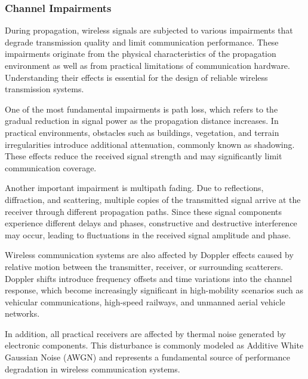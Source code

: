 \subsubsection{Channel Impairments}

During propagation, wireless signals are subjected to various impairments that degrade transmission quality and limit communication performance. These impairments originate from the physical characteristics of the propagation environment as well as from practical limitations of communication hardware. Understanding their effects is essential for the design of reliable wireless transmission systems.

One of the most fundamental impairments is path loss, which refers to the gradual reduction in signal power as the propagation distance increases. In practical environments, obstacles such as buildings, vegetation, and terrain irregularities introduce additional attenuation, commonly known as shadowing. These effects reduce the received signal strength and may significantly limit communication coverage.

Another important impairment is multipath fading. Due to reflections, diffraction, and scattering, multiple copies of the transmitted signal arrive at the receiver through different propagation paths. Since these signal components experience different delays and phases, constructive and destructive interference may occur, leading to fluctuations in the received signal amplitude and phase.

Wireless communication systems are also affected by Doppler effects caused by relative motion between the transmitter, receiver, or surrounding scatterers. Doppler shifts introduce frequency offsets and time variations into the channel response, which become increasingly significant in high-mobility scenarios such as vehicular communications, high-speed railways, and unmanned aerial vehicle networks.

In addition, all practical receivers are affected by thermal noise generated by electronic components. This disturbance is commonly modeled as Additive White Gaussian Noise (AWGN) and represents a fundamental source of performance degradation in wireless communication systems.

